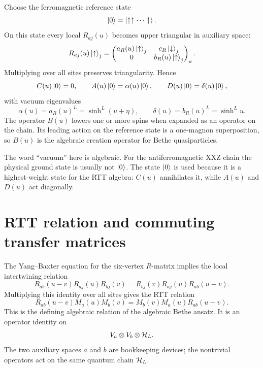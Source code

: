 Choose the ferromagnetic reference state
\begin{equation}
\label{eq:aba-reference-state}
    \left|0\right\rangle=\left|\uparrow\uparrow\cdots\uparrow\right\rangle .
\end{equation}
On this state every local $R_{aj}(u)$ becomes upper triangular in auxiliary
space:
\begin{equation}
\label{eq:aba-local-triangular-action}
    R_{aj}(u)\left|\uparrow\right\rangle_j
    =
    \begin{pmatrix}
        a_R(u)\left|\uparrow\right\rangle_j & c_R\left|\downarrow\right\rangle_j\\
        0&b_R(u)\left|\uparrow\right\rangle_j
    \end{pmatrix}_a .
\end{equation}
Multiplying over all sites preserves triangularity.  Hence
\begin{equation}
\label{eq:aba-pseudovacuum-action}
    C(u)\left|0\right\rangle=0,
    \qquad
    A(u)\left|0\right\rangle=\alpha(u)\left|0\right\rangle,
    \qquad
    D(u)\left|0\right\rangle=\delta(u)\left|0\right\rangle,
\end{equation}
with vacuum eigenvalues
\begin{equation}
\label{eq:aba-vacuum-eigenvalues}
    \alpha(u)=a_R(u)^L=\sinh^L(u+\eta),
    \qquad
    \delta(u)=b_R(u)^L=\sinh^L u .
\end{equation}
The operator $B(u)$ lowers one or more spins when expanded as an operator on the
chain.  Its leading action on the reference state is a one-magnon superposition,
so $B(u)$ is the algebraic creation operator for Bethe quasiparticles.

\begin{remark}[Pseudovacuum]
The word ``vacuum'' here is algebraic.  For the antiferromagnetic XXZ chain the
physical ground state is usually not $\left|0\right\rangle$.  The state $\left|0\right\rangle$ is used
because it is a highest-weight state for the RTT algebra: $C(u)$ annihilates it,
while $A(u)$ and $D(u)$ act diagonally.
\end{remark}

\section{RTT relation and commuting transfer matrices}
\label{sec:aba-rtt-commuting-transfer}

The Yang--Baxter equation for the six-vertex $R$-matrix implies the local
intertwining relation
\begin{equation}
\label{eq:aba-local-RLL}
    R_{ab}(u-v)R_{aj}(u)R_{bj}(v)
    =
    R_{bj}(v)R_{aj}(u)R_{ab}(u-v).
\end{equation}
Multiplying this identity over all sites gives the RTT relation
\begin{equation}
\label{eq:aba-RTT-relation}
    R_{ab}(u-v)M_a(u)M_b(v)
    =
    M_b(v)M_a(u)R_{ab}(u-v).
\end{equation}
This is the defining algebraic relation of the algebraic Bethe ansatz.  It is an
operator identity on
\begin{equation}
    V_a\otimes V_b\otimes\mathcal{H}_L .
\end{equation}
The two auxiliary spaces $a$ and $b$ are bookkeeping devices; the nontrivial
operators act on the same quantum chain $\mathcal{H}_L$.

